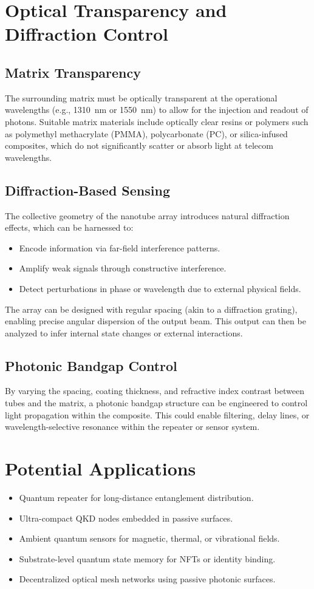 \documentclass[11pt]{article}
\begin{document}
	\section{Optical Transparency and Diffraction Control}
	\subsection{Matrix Transparency}
	The surrounding matrix must be optically transparent at the operational wavelengths (e.g., \SI{1310}{\nano\meter} or \SI{1550}{\nano\meter}) to allow for the injection and readout of photons. Suitable matrix materials include optically clear resins or polymers such as polymethyl methacrylate (PMMA), polycarbonate (PC), or silica-infused composites, which do not significantly scatter or absorb light at telecom wavelengths.
	
	\subsection{Diffraction-Based Sensing}
	The collective geometry of the nanotube array introduces natural diffraction effects, which can be harnessed to:
	\begin{itemize}
		\item Encode information via far-field interference patterns.
		\item Amplify weak signals through constructive interference.
		\item Detect perturbations in phase or wavelength due to external physical fields.
	\end{itemize}
	The array can be designed with regular spacing (akin to a diffraction grating), enabling precise angular dispersion of the output beam. This output can then be analyzed to infer internal state changes or external interactions.
	
	\subsection{Photonic Bandgap Control}
	By varying the spacing, coating thickness, and refractive index contrast between tubes and the matrix, a photonic bandgap structure can be engineered to control light propagation within the composite. This could enable filtering, delay lines, or wavelength-selective resonance within the repeater or sensor system.
	
	\section{Potential Applications}
	\begin{itemize}
		\item Quantum repeater for long-distance entanglement distribution.
		\item Ultra-compact QKD nodes embedded in passive surfaces.
		\item Ambient quantum sensors for magnetic, thermal, or vibrational fields.
		\item Substrate-level quantum state memory for NFTs or identity binding.
		\item Decentralized optical mesh networks using passive photonic surfaces.
	\end{itemize}
	
\end{document}
